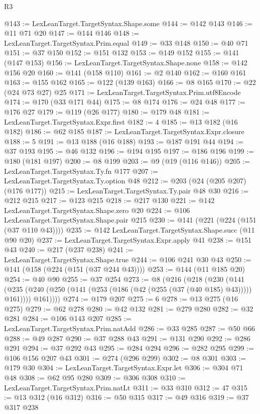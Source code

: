 \begin{lexlean}{R3}
\begin{coremodule}
@143 := LexLeanTarget.TargetSyntax.Shape.some
@144 := @142 @143
@146 := @11 @71 @20
@147 := @144 @146
@148 := LexLeanTarget.TargetSyntax.Prim.equal
@149 := @33 @148
@150 := @40 @71
@151 := @37 @150
@152 := @151 @132
@153 := @149 @152
@155 := @141 (@147 @153)
@156 := LexLeanTarget.TargetSyntax.Shape.none
@158 := @142 @156 @20
@160 := @141 (@158 @110)
@161 := @2 @140
@162 := @160 @161
@163 := @155 @162
@165 := @122 (@139 @163)
@166 := @8 @165
@170 := @22 (@24 @73 @27) @25
@171 := LexLeanTarget.TargetSyntax.Prim.utf8Encode
@174 := @170 (@33 @171 @44)
@175 := @8 @174
@176 := @24 @48
@177 := @176 @27
@179 := @119 (@26 @177)
@180 := @179 @48
@181 := LexLeanTarget.TargetSyntax.Expr.first
@182 := 4
@185 := @13 @182 (@16 @182)
@186 := @62 @185
@187 := LexLeanTarget.TargetSyntax.Expr.closure
@188 := 5
@191 := @13 @188 (@16 @188)
@193 := @187 @191 @44
@194 := @37 @193
@195 := @46 @132
@196 := @194 @195
@197 := @186 @196
@199 := @180 (@181 @197)
@200 := @8 @199
@203 := @9 (@19 (@116 @146))
@205 := LexLeanTarget.TargetSyntax.Ty.fn @177
@207 := LexLeanTarget.TargetSyntax.Ty.option @48
@212 := @203 (@24 (@205 @207) (@176 @177))
@215 := LexLeanTarget.TargetSyntax.Ty.pair @48 @30
@216 := @212 @215
@217 := @123 @215
@218 := @217 @130
@221 := @142 LexLeanTarget.TargetSyntax.Shape.zero @20
@224 := @106 LexLeanTarget.TargetSyntax.Shape.pair @215
@230 := @141 (@221 (@224 (@151 (@37 @110 @43))))
@235 := @142 LexLeanTarget.TargetSyntax.Shape.succ (@11 @90 @20)
@237 := LexLeanTarget.TargetSyntax.Expr.apply @41
@238 := @151 @43
@240 := @217 (@237 @238)
@241 := LexLeanTarget.TargetSyntax.Shape.true
@244 := @106 @241 @30 @43
@250 := @141 (@158 (@224 (@151 (@37 @244 @43))))
@253 := @144 (@11 @185 @20)
@254 := @40 @90
@255 := @37 @254
@273 := @8
    (@216
      (@218
        (@230
          (@141
            (@235 (@240 (@250 (@141 (@253 (@186 (@42 (@255 (@37 (@40 @185) @43))))) @161))))
            @161))))
@274 := @179 @207
@275 := 6
@278 := @13 @275 (@16 @275)
@279 := @62 @278
@280 := @42 @132
@281 := @279 @280
@282 := @32 @281
@284 := @106 @143 @207
@285 := LexLeanTarget.TargetSyntax.Prim.natAdd
@286 := @33 @285
@287 := @50 @66
@288 := @49 @287
@290 := @37 @288 @43
@291 := @131 @290
@292 := @286 @291
@294 := @37 @292 @43
@295 := @284 @294
@296 := @282 @295
@299 := @106 @156 @207 @43
@301 := @274 (@296 @299)
@302 := @8 @301
@303 := @179 @30
@304 := LexLeanTarget.TargetSyntax.Expr.let
@306 := @304 @71 @48
@308 := @62 @95 @280
@309 := @306 @308
@310 := LexLeanTarget.TargetSyntax.Prim.natLt
@311 := @33 @310
@312 := 47
@315 := @13 @312 (@16 @312)
@316 := @50 @315
@317 := @49 @316
@319 := @37 @317 @238

\end{coremodule}
\end{lexlean}
